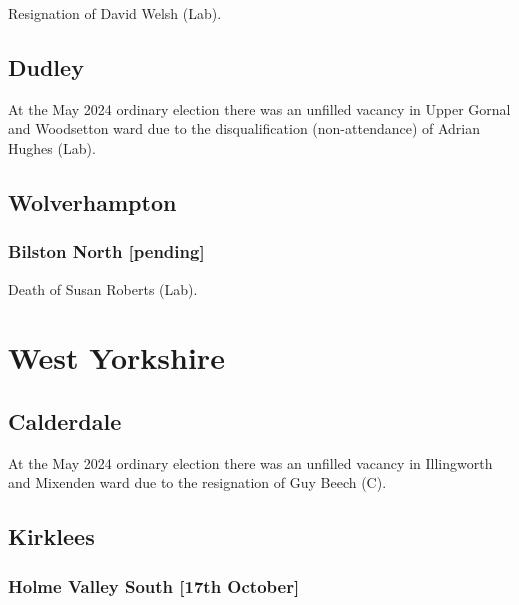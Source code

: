 \documentclass[a4paper,openany]{book}
\begin{document}
\begin{resultsiii}

Resignation of David Welsh (Lab).

\subsection*{Dudley}

At the May 2024 ordinary election there was an unfilled vacancy in Upper Gornal and Woodsetton ward due to the disqualification (non-attendance) of Adrian Hughes (Lab).%

\subsection*{Wolverhampton}

\subsubsection*{Bilston North \hspace*{\fill}\nolinebreak[1]%
	\enspace\hspace*{\fill}
	[pending]}


Death of Susan Roberts (Lab).

\section{West Yorkshire}

\subsection*{Calderdale}

At the May 2024 ordinary election there was an unfilled vacancy in Illingworth and Mixenden ward due to the resignation of Guy Beech (C).%

\subsection*{Kirklees}

\subsubsection*{Holme Valley South \hspace*{\fill}\nolinebreak[1]%
	\enspace\hspace*{\fill}
	[17th October]}


\end{resultsiii}
\end{document}
